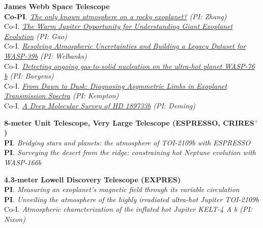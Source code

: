 \documentclass[letterpaper,11pt]{article}
\begin{document}
\small
  \begin{list}{}{\cvlist}  

  
  
  \item[{\color{numcolor}}]\textbf{James Webb Space Telescope} \\
\textbf{Co-PI}. \textit{\href{https://www.stsci.edu/jwst/science-execution/program-information?id=7875}{The only known atmosphere on a rocky exoplanet?} (PI: Zhang)} \\
Co-I. \textit{\href{https://www.stsci.edu/jwst/science-execution/program-information?id=9025}{The Warm Jupiter Opportunity for Understanding Giant Exoplanet Evolution} (PI: Gao)} \\
Co-I. \textit{\href{https://www.stsci.edu/jwst/science-execution/program-information?id=8017}{Resolving Atmospheric Uncertainties and Building a Legacy Dataset for WASP-39b} (PI: Welbanks)} \\
  Co-I. \textit{\href{https://www.stsci.edu/jwst/science-execution/program-information?id=6045}{Detecting ongoing gas-to-solid nucleation on the ultra-hot planet WASP-76 b} (PI: Baeyens)} \\
  Co-I. \textit{\href{https://www.stsci.edu/jwst/science-execution/program-information?id=5275}{From Dawn to Dusk: Diagnosing Asymmetric Limbs in Exoplanet Transmission Spectra} (PI: Kempton)} \\ 
  Co-I. \textit{\href{https://www.stsci.edu/jwst/science-execution/program-information?id=1633}{A Deep Molecular Survey of HD 189733b} (PI: Deming)}

  \item[{\color{numcolor}}]\textbf{8-meter Unit Telescope, Very Large Telescope (ESPRESSO, CRIRES$^+$)} \\
\textbf{PI}. \textit{Bridging stars and planets: the atmosphere of TOI-2109b with ESPRESSO} \\
\textbf{PI}. \textit{Surveying the desert from the ridge: constraining hot Neptune evolution with WASP-166b} \\

  \item[{\color{numcolor}}]\textbf{4.3-meter Lowell Discovery Telescope (EXPRES)} \\
      \textbf{PI}. \textit{Measuring an exoplanet’s magnetic field through its variable circulation}\\
     \textbf{PI}. \textit{Unveiling the atmosphere of the highly irradiated ultra-hot Jupiter TOI-2109b}\\
     Co-I. \textit{Atmospheric characterization of the inflated hot Jupiter KELT-4 A b (PI: Nixon)}


\end{list}
\end{document}
